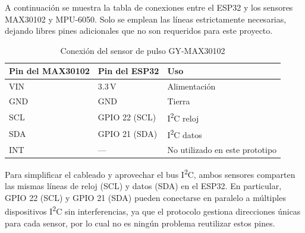 \documentclass[12pt, a4paper]{article}
\begin{document}
	A continuación se muestra la tabla de conexiones entre el ESP32 y los sensores MAX30102 y MPU-6050. Solo se emplean las líneas estrictamente necesarias, dejando libres pines adicionales que no son requeridos para este proyecto.

	\begin{table}[ht]
		\centering
		\caption{Conexión del sensor de pulso GY-MAX30102}
		\label{tab:conexion_max30102}
		\begin{tabular}{|p{4cm}|p{3cm}|p{5cm}|}
			\hline
			\textbf{Pin del MAX30102} & \textbf{Pin del ESP32}      & \textbf{Uso}                    \\ \hline
			VIN                        & 3.3\,V                       & Alimentación                          \\ \hline
			GND                        & GND                          & Tierra                                   \\ \hline
			SCL                        & GPIO 22 (SCL)                & I\textsuperscript{2}C reloj            \\ \hline
			SDA                        & GPIO 21 (SDA)                & I\textsuperscript{2}C datos            \\ \hline
			INT                        & —                            & No utilizado en este prototipo        \\ \hline
		\end{tabular}
	\end{table}
	
		
	
	Para simplificar el cableado y aprovechar el bus I\textsuperscript{2}C, ambos sensores comparten las mismas líneas de reloj (SCL) y datos (SDA) en el ESP32. En particular, GPIO 22 (SCL) y GPIO 21 (SDA) pueden conectarse en paralelo a múltiples dispositivos I\textsuperscript{2}C sin interferencias, ya que el protocolo gestiona direcciones únicas para cada sensor, por lo cual no es ningún problema reutilizar estos pines.
	
\end{document}
